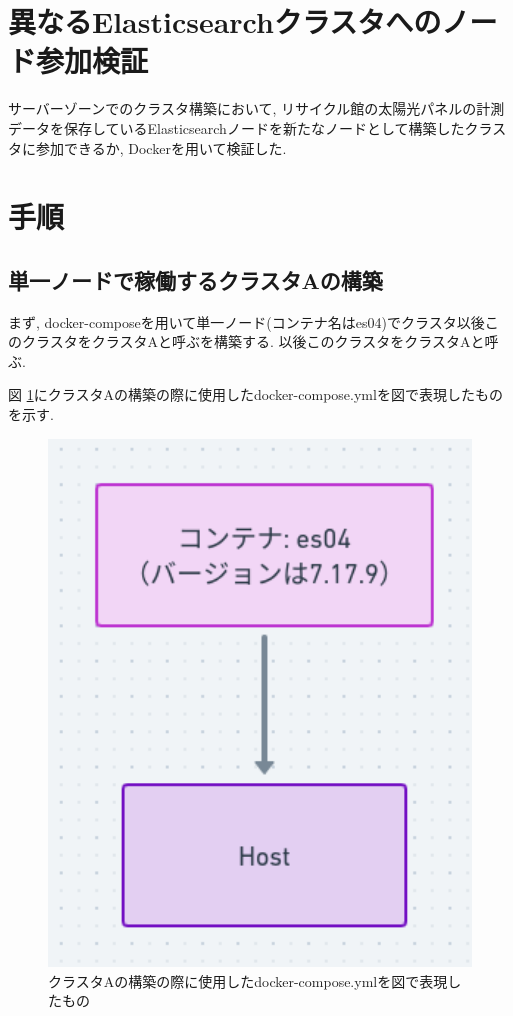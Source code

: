 \section{異なるElasticsearchクラスタへのノード参加検証}
サーバーゾーンでのクラスタ構築において, リサイクル館の太陽光パネルの計測データを保存しているElasticsearchノードを新たなノードとして構築したクラスタに参加できるか, Dockerを用いて検証した.

\section{手順}

\subsection{単一ノードで稼働するクラスタAの構築}

まず, docker-composeを用いて単一ノード(コンテナ名はes04)でクラスタ以後このクラスタをクラスタAと呼ぶを構築する. 以後このクラスタをクラスタAと呼ぶ.

図 \ref{d3}にクラスタAの構築の際に使用したdocker-compose.ymlを図で表現したものを示す.

\begin{figure}[h]
  \begin{center}
    \includegraphics[width=160mm]{sotu/figure/1-7.17.9.png}
    \caption{クラスタAの構築の際に使用したdocker-compose.ymlを図で表現したもの}
    \label{d3}
  \end{center}
\end{figure}

